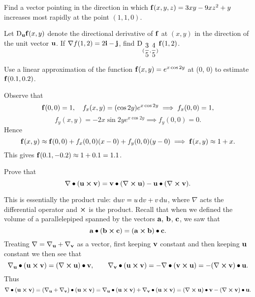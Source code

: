 \begin{multicols}{2}
\begin{problem}
Find a vector pointing in the direction in which $\mathbf{ f}(x,y,z) = 3xy
-9xz^2+y$ increases most rapidly at the point $(1, 1, 0)$.
\end{problem}
\begin{problem}
Let  $\mathrm{D}_{\mathbf{ u}}\mathbf{ f}(x,y)$ denote the directional
derivative of $\mathbf{ f}$ at $(x,y)$ in the direction of the unit vector
 $\mathbf{ u}$. If $\nabla f(1,2) = 2\mathbf{ i} - \mathbf{ j}$, find
$\mathrm{D}_{(\dfrac{3}{5},\dfrac{4}{5})}\mathbf{ f}(1,2)$.
\end{problem}
\begin{problem}
Use a linear approximation of the function $\mathbf{ f}(x, y) = e^{x\cos 2y}$
at (0, 0) to estimate $\mathbf{ f}(0.1, 0.2)$.
\begin{answer}
Observe that $$\mathbf{ f}(0,0) =1, \quad f_x(x,y) = (\cos 2y)e^{x\cos 2y}
\implies f_x(0,0)=1, $$ $$ f_y(x,y) = -2x\sin 2ye^{x\cos 2y}
\implies f_y(0,0) = 0.
$$Hence
$$\mathbf{ f}(x,y) \approx \mathbf{ f}(0,0) + f_x(0,0)(x-0) + f_y(0,0)(y-0) \implies \mathbf{ f}(x,y)\approx 1 + x. $$
This gives $\mathbf{ f}(0.1,-0.2)\approx 1+0.1 = 1.1$.
\end{answer}
\end{problem}

\begin{problem}
Prove that
$$ \nabla \bullet ({\mathbf u}\boldsymbol\times {\mathbf v}) = {\mathbf v}\bullet ({\nabla}\boldsymbol\times {\mathbf u}) - {\mathbf u}\bullet ({\nabla}\boldsymbol\times {\mathbf v}). $$
\begin{answer}
This is essentially the product rule: $\d{uv} = u\d{v}+v\d{u}$,
where $\nabla$ acts the differential operator and $\boldsymbol\times$ is the
product. Recall that when we defined the volume of a parallelepiped
spanned by the vectors $\mathbf{ a},$ $\mathbf{ b}$, $\mathbf{ c}$, we
saw that
$$ \mathbf{ a}\bullet (\mathbf{ b}\boldsymbol\times\mathbf{ c}) = (\mathbf{ a}\boldsymbol\times\mathbf{ b})\bullet \mathbf{ c}.  $$
Treating $\nabla = \nabla _{\mathbf{ u}}+ \nabla _{\mathbf{ v}}$ as a
vector, first keeping $\mathbf{ v}$ constant and then keeping
$\mathbf{ u}$ constant  we then see that
$$ \nabla _{\mathbf{ u}} \bullet (\mathbf{ u}\boldsymbol\times\mathbf{ v})= (\mathbf{ \nabla}\boldsymbol\times\mathbf{ u})\bullet \mathbf{ v}, \qquad   \nabla  _{\mathbf{ v}} \bullet (\mathbf{ u}\boldsymbol\times\mathbf{ v})=  -\nabla \bullet (\mathbf{ v}\boldsymbol\times\mathbf{ u})  = -(\mathbf{ \nabla}\boldsymbol\times\mathbf{ v})\bullet \mathbf{ u}. $$
Thus
$$\nabla \bullet ({\mathbf u}\boldsymbol\times {\mathbf v}) = (\nabla _{\mathbf{ u}} + \nabla _{\mathbf{ v}}) \bullet ({\mathbf u}\boldsymbol\times {\mathbf v})
= \nabla _{\mathbf{ u}} \bullet (\mathbf{ u}\boldsymbol\times\mathbf{ v}) + \nabla
_{\mathbf{ v}} \bullet (\mathbf{ u}\boldsymbol\times\mathbf{ v}) =
(\mathbf{ \nabla}\boldsymbol\times\mathbf{ u})\bullet \mathbf{ v}-
(\mathbf{ \nabla}\boldsymbol\times\mathbf{ v})\bullet \mathbf{ u}.
   $$
\end{answer}



\end{problem}
\end{multicols}
